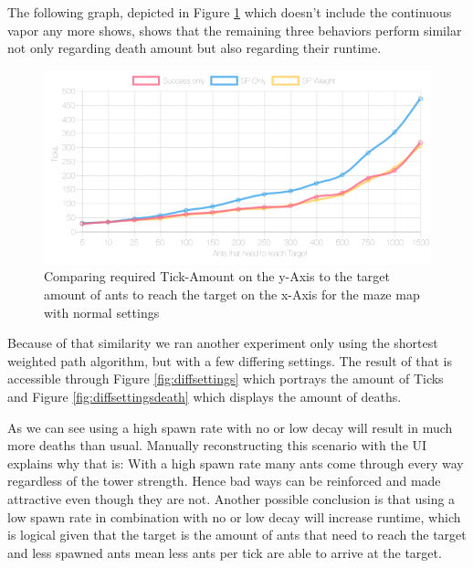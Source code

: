The following graph, depicted in Figure \ref{fig:threesame} which doesn't include the continuous vapor any more shows, shows that the remaining three behaviors perform similar not only regarding death amount but also regarding their runtime.

\begin{figure}[H]
  \centering
  \includegraphics[width=1\linewidth]{images/normalsquaremaze-ticks-line}
  \caption{Comparing required Tick-Amount on the y-Axis to the target amount of ants to reach the target on the x-Axis for the maze map with normal settings}
  \label{fig:threesame}
\end{figure}

Because of that similarity we ran another experiment only using the shortest weighted path algorithm, but with a few differing settings. The result of that is accessible through Figure \ref{fig:diffsettings} which portrays the amount of Ticks and Figure \ref{fig:diffsettingsdeath} which displays the amount of deaths.

As we can see using a high spawn rate with no or low decay will result in much more deaths than usual. Manually reconstructing this scenario with the UI explains why that is: With a high spawn rate many ants come through every way regardless of the tower strength. Hence bad ways can be reinforced and made attractive even though they are not.
Another possible conclusion is that using a low spawn rate in combination with no or low decay will increase runtime, which is logical given that the target is the amount of ants that need to reach the target and less spawned ants mean less ants per tick are able to arrive at the target. 

